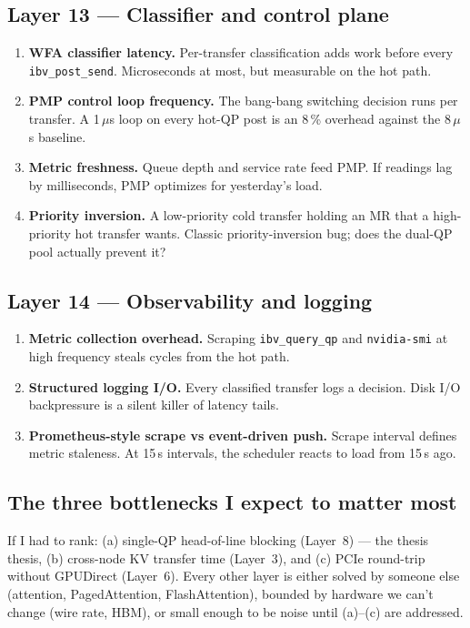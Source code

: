 \documentclass[11pt]{article}
\begin{document}
\subsection*{Layer 13 --- Classifier and control plane}
\begin{enumerate}[resume]
\item \textbf{WFA classifier latency.} Per-transfer classification
adds work before every \texttt{ibv\_post\_send}. Microseconds at
most, but measurable on the hot path.
\item \textbf{PMP control loop frequency.} The bang-bang switching
decision runs per transfer. A 1\,$\mu$s loop on every hot-QP post is
an 8\,\% overhead against the 8\,$\mu$s baseline.
\item \textbf{Metric freshness.} Queue depth and service rate feed
PMP. If readings lag by milliseconds, PMP optimizes for yesterday's
load.
\item \textbf{Priority inversion.} A low-priority cold transfer
holding an MR that a high-priority hot transfer wants. Classic
priority-inversion bug; does the dual-QP pool actually prevent it?
\end{enumerate}

\subsection*{Layer 14 --- Observability and logging}
\begin{enumerate}[resume]
\item \textbf{Metric collection overhead.} Scraping
\texttt{ibv\_query\_qp} and \texttt{nvidia-smi} at high frequency
steals cycles from the hot path.
\item \textbf{Structured logging I/O.} Every classified transfer logs
a decision. Disk I/O backpressure is a silent killer of latency
tails.
\item \textbf{Prometheus-style scrape vs event-driven push.} Scrape
interval defines metric staleness. At 15\,s intervals, the scheduler
reacts to load from 15\,s ago.
\end{enumerate}

\subsection*{The three bottlenecks I expect to matter most}

If I had to rank: (a) single-QP head-of-line blocking (Layer~8) ---
the thesis thesis, (b) cross-node KV transfer time (Layer~3), and
(c) PCIe round-trip without GPUDirect (Layer~6). Every other layer
is either solved by someone else (attention, PagedAttention,
FlashAttention), bounded by hardware we can't change (wire rate,
HBM), or small enough to be noise until (a)--(c) are addressed.
\end{document}
